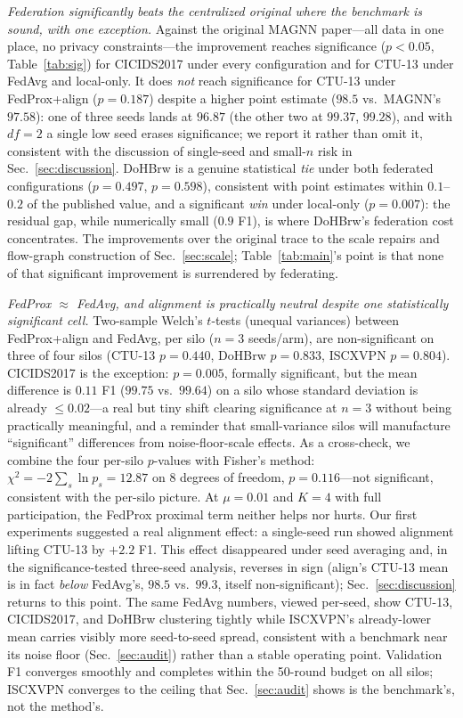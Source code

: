\documentclass[journal]{IEEEtran}
\begin{document}
\emph{Federation significantly beats the centralized original where
the benchmark is sound, with one exception.} Against the
original MAGNN paper---all data in one place, no privacy
constraints---the improvement reaches significance ($p<0.05$,
Table~\ref{tab:sig}) for CICIDS2017 under every configuration and for
CTU-13 under FedAvg and local-only. It does \emph{not} reach
significance for CTU-13 under FedProx+align ($p{=}0.187$) despite a
higher point estimate ($98.5$ vs.\ MAGNN's $97.58$): one of three
seeds lands at $96.87$ (the other two at $99.37$, $99.28$), and with
$df{=}2$ a single low seed erases significance; we report it rather
than omit it, consistent with the discussion of single-seed and
small-$n$ risk in Sec.~\ref{sec:discussion}. DoHBrw is a genuine
statistical \emph{tie} under both federated configurations
($p{=}0.497$, $p{=}0.598$), consistent with point estimates within
$0.1$--$0.2$ of the published value, and a significant \emph{win}
under local-only ($p{=}0.007$): the residual gap, while numerically
small ($0.9$ F1), is where DoHBrw's federation cost concentrates. The
improvements over the original trace to the scale repairs and
flow-graph construction of Sec.~\ref{sec:scale}; Table~\ref{tab:main}'s
point is that none of that significant improvement is surrendered by
federating.

\emph{FedProx $\approx$ FedAvg, and alignment is practically neutral
despite one statistically significant cell.} Two-sample Welch's
$t$-tests (unequal variances) between FedProx+align and FedAvg, per
silo ($n{=}3$ seeds/arm), are non-significant on three of four silos
(CTU-13 $p{=}0.440$, DoHBrw $p{=}0.833$, ISCXVPN $p{=}0.804$).
CICIDS2017 is the exception: $p{=}0.005$, formally significant, but
the mean difference is $0.11$ F1 ($99.75$ vs.\ $99.64$) on a silo
whose standard deviation is already $\le 0.02$---a real but tiny shift
clearing significance at $n{=}3$ without being practically meaningful,
and a reminder that small-variance silos will manufacture
``significant'' differences from noise-floor-scale effects. As a
cross-check, we combine the four per-silo $p$-values with Fisher's
method: $\chi^2 = -2\sum_{s} \ln p_s = 12.87$ on $8$ degrees of
freedom, $p{=}0.116$---not significant, consistent with the per-silo
picture. At $\mu{=}0.01$ and $K{=}4$ with full participation, the
FedProx proximal term neither helps nor hurts. Our first experiments
suggested a real alignment effect: a single-seed run showed alignment
lifting CTU-13 by $+2.2$ F1. This effect disappeared under seed
averaging and, in the significance-tested three-seed analysis,
reverses in sign (align's CTU-13 mean is in fact \emph{below}
FedAvg's, $98.5$ vs.\ $99.3$, itself non-significant);
Sec.~\ref{sec:discussion} returns to this point. The
same FedAvg numbers, viewed per-seed, show CTU-13, CICIDS2017, and
DoHBrw clustering tightly while ISCXVPN's already-lower mean carries
visibly more seed-to-seed spread, consistent with a benchmark near its
noise floor (Sec.~\ref{sec:audit}) rather than a stable operating
point. Validation F1 converges smoothly and completes within the
50-round budget on all silos; ISCXVPN
converges to the ceiling that Sec.~\ref{sec:audit} shows is the
benchmark's, not the method's.
\end{document}
